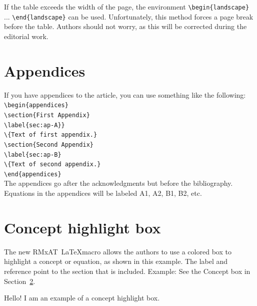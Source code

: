 \documentclass[10pt,letter,twoside]{rmat-rho}
\newcommand\rmaatex{RMxAT~\LaTeX}
\newcommand{\CS}[1]{\texttt{\textbackslash #1}}
\begin{document}
        If the table exceeds the width of the page, the environment \verb'\begin{landscape}' ... \verb'\end{landscape}' can be used. Unfortunately, this method forces a page break before the table. Authors should not worry, as this will be corrected during the editorial work.

\section{Appendices}

If you have appendices to the article, you can use something like the following: \hfill \\

\CS{begin}\verb|{appendices}|\\
\CS{section}\verb|{First Appendix}|\\
\CS{label}\verb|{sec:ap-A}}|\\
\CS{}\verb|{Text of first appendix.}|\\
\CS{section}\verb|{Second Appendix}|\\
\CS{label}\verb|{sec:ap-B}|\\
\CS{}\verb|{Text of second appendix.}|\\
\CS{end}\verb|{appendices}|\\

The appendices go after the acknowledgments but before the
bibliography. Equations in the appendices will be labeled
A1, A2, B1, B2, etc.

\section{Concept highlight box}\label{box:box1}

 
The new \rmaatex macro allows the authors to use a colored box to highlight a concept or equation, as shown in this example. The label and reference point to the section that is included. Example: See the Concept box in Section~\ref{box:box1}.  
    
        \begin{rhoenv}[frametitle=Highlight Concept Box,backgroundcolor=\rhotheme!22]
            Hello! I am an example of a concept highlight box. \label{box:boxy}
        \end{rhoenv}
    


\end{document}
